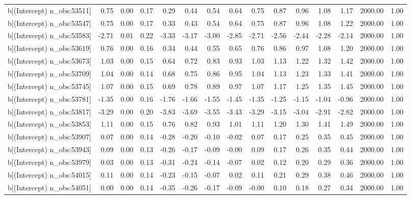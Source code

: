 \begin{table}[ht]
\begin{tabular}{rrrrrrrrrrrrrrr}
  b[(Intercept) n\_obs:53511] & 0.75 & 0.00 & 0.17 & 0.29 & 0.44 & 0.54 & 0.64 & 0.75 & 0.87 & 0.96 & 1.08 & 1.17 & 2000.00 & 1.00 \\ 
  b[(Intercept) n\_obs:53547] & 0.75 & 0.00 & 0.17 & 0.33 & 0.43 & 0.54 & 0.64 & 0.75 & 0.87 & 0.96 & 1.08 & 1.22 & 2000.00 & 1.00 \\ 
  b[(Intercept) n\_obs:53583] & -2.71 & 0.01 & 0.22 & -3.33 & -3.17 & -3.00 & -2.85 & -2.71 & -2.56 & -2.44 & -2.28 & -2.14 & 2000.00 & 1.00 \\ 
  b[(Intercept) n\_obs:53619] & 0.76 & 0.00 & 0.16 & 0.34 & 0.44 & 0.55 & 0.65 & 0.76 & 0.86 & 0.97 & 1.08 & 1.20 & 2000.00 & 1.00 \\ 
  b[(Intercept) n\_obs:53673] & 1.03 & 0.00 & 0.15 & 0.64 & 0.72 & 0.83 & 0.93 & 1.03 & 1.13 & 1.22 & 1.32 & 1.42 & 2000.00 & 1.00 \\ 
  b[(Intercept) n\_obs:53709] & 1.04 & 0.00 & 0.14 & 0.68 & 0.75 & 0.86 & 0.95 & 1.04 & 1.13 & 1.23 & 1.33 & 1.41 & 2000.00 & 1.00 \\ 
  b[(Intercept) n\_obs:53745] & 1.07 & 0.00 & 0.15 & 0.69 & 0.78 & 0.89 & 0.97 & 1.07 & 1.17 & 1.25 & 1.35 & 1.45 & 2000.00 & 1.00 \\ 
  b[(Intercept) n\_obs:53781] & -1.35 & 0.00 & 0.16 & -1.76 & -1.66 & -1.55 & -1.45 & -1.35 & -1.25 & -1.15 & -1.04 & -0.96 & 2000.00 & 1.00 \\ 
  b[(Intercept) n\_obs:53817] & -3.29 & 0.00 & 0.20 & -3.83 & -3.69 & -3.55 & -3.43 & -3.29 & -3.15 & -3.04 & -2.91 & -2.82 & 2000.00 & 1.00 \\ 
  b[(Intercept) n\_obs:53853] & 1.11 & 0.00 & 0.15 & 0.76 & 0.82 & 0.93 & 1.01 & 1.11 & 1.20 & 1.30 & 1.41 & 1.49 & 2000.00 & 1.00 \\ 
  b[(Intercept) n\_obs:53907] & 0.07 & 0.00 & 0.14 & -0.28 & -0.20 & -0.10 & -0.02 & 0.07 & 0.17 & 0.25 & 0.35 & 0.45 & 2000.00 & 1.00 \\ 
  b[(Intercept) n\_obs:53943] & 0.09 & 0.00 & 0.13 & -0.26 & -0.17 & -0.09 & -0.00 & 0.09 & 0.17 & 0.26 & 0.35 & 0.44 & 2000.00 & 1.00 \\ 
  b[(Intercept) n\_obs:53979] & 0.03 & 0.00 & 0.13 & -0.31 & -0.24 & -0.14 & -0.07 & 0.02 & 0.12 & 0.20 & 0.29 & 0.36 & 2000.00 & 1.00 \\ 
  b[(Intercept) n\_obs:54015] & 0.11 & 0.00 & 0.14 & -0.23 & -0.15 & -0.07 & 0.02 & 0.11 & 0.21 & 0.29 & 0.38 & 0.46 & 2000.00 & 1.00 \\ 
  b[(Intercept) n\_obs:54051] & 0.00 & 0.00 & 0.14 & -0.35 & -0.26 & -0.17 & -0.09 & -0.00 & 0.10 & 0.18 & 0.27 & 0.34 & 2000.00 & 1.00 \\ 

\end{tabular}
\end{table}
